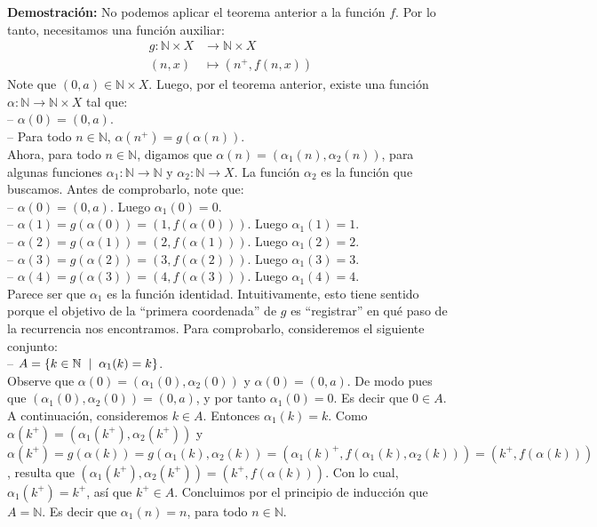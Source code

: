 \documentclass[10 pt]{article}
\begin{document}
\Large{\textbf{Demostración:} No podemos aplicar el teorema anterior a la función $f$. Por lo tanto, necesitamos una función auxiliar:}
\begin{align*}
    g: \mathbb N \times X &\rightarrow \mathbb N \times X \\
    (n,x) &\mapsto (n^+,f(n,x))
\end{align*}
\Large{Note que $(0,a) \in \mathbb N \times X$. Luego, por el teorema anterior, existe una función $\alpha:\mathbb N \rightarrow \mathbb N \times X$ tal que: \\

-- $\alpha(0)=(0,a)$. \\

-- Para todo $n \in \mathbb N$, $\alpha(n^+)=g(\alpha(n))$. \\

 Ahora, para todo $n \in \mathbb N$, digamos que $\alpha(n)=(\alpha_1(n),\alpha_2(n))$, para algunas funciones $\alpha_1:\mathbb N \rightarrow \mathbb N$ y $\alpha_2:\mathbb N \rightarrow X$. La función $\alpha_2$ es la función que buscamos. Antes de comprobarlo, note que: \\

 -- $\alpha(0)=(0,a)$. Luego $\alpha_1(0)=0$. \\

 -- $\alpha(1)=g(\alpha(0))=(1,f(\alpha(0)))$. Luego $\alpha_1(1)=1$. \\

 -- $\alpha(2)=g(\alpha(1))=(2,f(\alpha(1)))$. Luego $\alpha_1(2)=2$. \\

 -- $\alpha(3)=g(\alpha(2))=(3,f(\alpha(2)))$. Luego $\alpha_1(3)=3$. \\

 -- $\alpha(4)=g(\alpha(3))=(4,f(\alpha(3)))$. Luego $\alpha_1(4)=4$. \\

 Parece ser que $\alpha_1$ es la función identidad. Intuitivamente, esto tiene sentido porque el objetivo de la ``primera coordenada'' de $g$ es ``registrar'' en qué paso de la recurrencia nos encontramos. Para comprobarlo, consideremos el siguiente conjunto: \\

 -- $A=\{k \in \mathbb N \hspace{0.2 cm}|\hspace{0.2 cm}\alpha_1(k)=k\}$. \\

 Observe que $\alpha(0)=(\alpha_1(0),\alpha_2(0))$ y $\alpha(0)=(0,a)$. De modo pues que $(\alpha_1(0),\alpha_2(0))=(0,a)$, y por tanto $\alpha_1(0)=0$. Es decir que $0 \in A$. A continuación, consideremos $k \in A$. Entonces $\alpha_1(k)=k$. Como $\alpha(k^+)=(\alpha_1(k^+),\alpha_2(k^+))$ y $\alpha(k^+)=g(\alpha(k))=g(\alpha_1(k),\alpha_2(k))=(\alpha_1(k)^+,f(\alpha_1(k),\alpha_2(k)))=(k^+,f(\alpha(k)))$, resulta que $(\alpha_1(k^+),\alpha_2(k^+))=(k^+,f(\alpha(k)))$. Con lo cual, $\alpha_1(k^+)=k^+$, así que $k^+ \in A$. Concluimos por el principio de inducción que $A=\mathbb N$. Es decir que $\alpha_1(n)=n$, para todo $n \in \mathbb N$. \\
 
}
\end{document}
